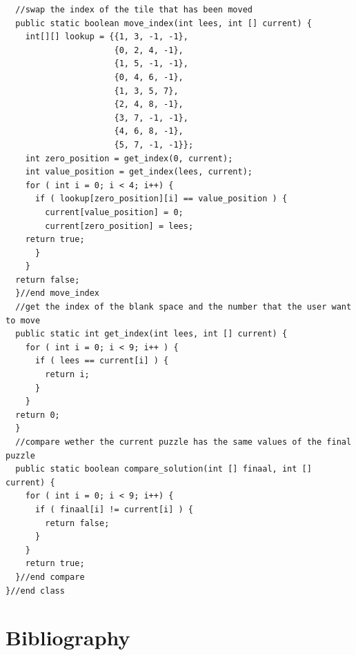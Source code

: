 \documentclass[10pt]{article}
\begin{document}
\begin{tiny}
\begin{verbatim}
  //swap the index of the tile that has been moved
  public static boolean move_index(int lees, int [] current) {
    int[][] lookup = {{1, 3, -1, -1},
                      {0, 2, 4, -1},
                      {1, 5, -1, -1},
                      {0, 4, 6, -1},
                      {1, 3, 5, 7},
                      {2, 4, 8, -1},
                      {3, 7, -1, -1},
                      {4, 6, 8, -1},
                      {5, 7, -1, -1}};
    int zero_position = get_index(0, current);
    int value_position = get_index(lees, current);
    for ( int i = 0; i < 4; i++) {
      if ( lookup[zero_position][i] == value_position ) {
        current[value_position] = 0;
        current[zero_position] = lees;
    return true;
      }
    }
  return false;
  }//end move_index
  //get the index of the blank space and the number that the user want to move
  public static int get_index(int lees, int [] current) {
    for ( int i = 0; i < 9; i++ ) {
      if ( lees == current[i] ) {
        return i;
      }
    }
  return 0;
  }
  //compare wether the current puzzle has the same values of the final puzzle
  public static boolean compare_solution(int [] finaal, int [] current) {
    for ( int i = 0; i < 9; i++) {
      if ( finaal[i] != current[i] ) {
        return false;
      }
    }
    return true;
  }//end compare
}//end class
  \end{verbatim}
   \end{tiny}
   \section*{Bibliography}


\end{document}
